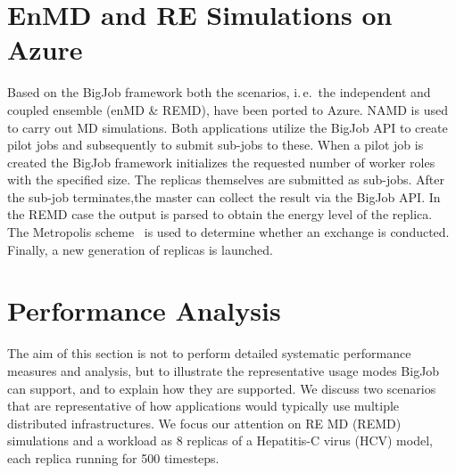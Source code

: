 \documentclass[conference,final]{IEEEtran}
\newcommand{\up}{\vspace*{-1em}}
\newcommand{\numrep}{8 }
\begin{document}
\section{EnMD and RE Simulations on Azure}
\label{sec:enMD-REMD}
\up
Based on the BigJob framework both the scenarios, i.\,e.\ the
independent and coupled ensemble (enMD \& REMD),
have been ported to Azure. NAMD is used to carry out MD simulations.
Both applications utilize the BigJob API to create pilot jobs
and subsequently to submit sub-jobs to these. When a pilot job is
created the BigJob framework initializes the requested number
of worker roles with the specified size. The replicas themselves are submitted as
sub-jobs. 
After the sub-job terminates,the master can collect the result via the BigJob API. 
In the REMD case the output is parsed to obtain the energy level of the replica. 
The Metropolis scheme~\cite{metropolis:1087} is used to determine whether
an exchange is conducted. Finally, a new generation of replicas is launched.



\up
\section{Performance Analysis}
\label{sec:performance}
\up
The aim of this section is not to perform detailed systematic
performance measures and analysis, but to illustrate the
representative usage modes BigJob can support, and to explain how they
are supported.  We discuss two scenarios that are representative of
how applications would typically use multiple distributed
infrastructures. We focus our attention on RE MD (REMD)
simulations and a workload as \numrep replicas of a Hepatitis-C virus
(HCV) model, each replica running for 500 timesteps.
\up
\end{document}
